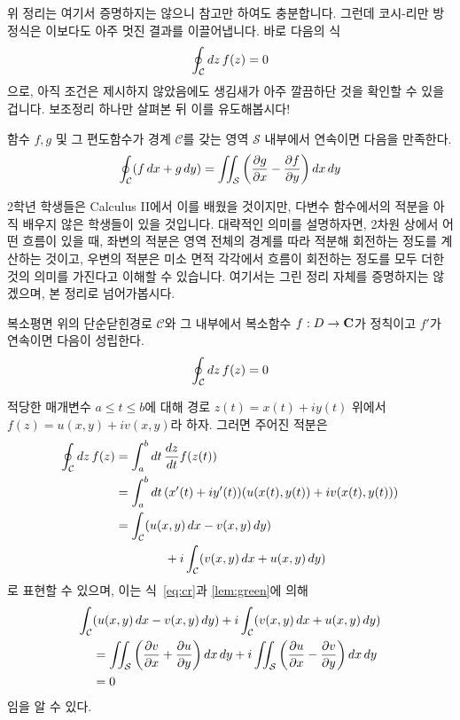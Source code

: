 \documentclass[11pt]{book}
\begin{document}
\begin{MLPar}
위 정리는 여기서 증명하지는 않으니 참고만 하여도 충분합니다.
그런데 코시-리만 방정식은 이보다도 아주 멋진 결과를 이끌어냅니다.
바로 다음의 식
\[\oint_{\mathcal{C}}\dd{z} f(z) = 0\]
으로, 아직 조건은 제시하지 않았음에도 생김새가 아주 깔끔하단 것을 확인할 수 있을겁니다.
보조정리 하나만 살펴본 뒤 이를 유도해봅시다!
\end{MLPar}

\begin{MLLem}
함수 \(f, g\) 및 그 편도함수가 경계 \(\mathcal{C}\)를 갖는 영역 \(\mathcal{S}\) 내부에서 연속이면 다음을 만족한다.
\[\cint(f\dd{x} + g\dd{y}) = \iint_{\mathcal{S}}\pqty{\pdv{g}{x}-\pdv{f}{y}}\dd{x}\dd{y}\]
\end{MLLem}

\begin{MLPar}
2학년 학생들은 Calculus II에서 이를 배웠을 것이지만, 다변수 함수에서의 적분을 아직 배우지 않은 학생들이 있을 것입니다.
대략적인 의미를 설명하자면, 2차원 상에서 어떤 흐름이 있을 때, 좌변의 적분은 영역 전체의 경계를 따라 적분해 회전하는 정도를 계산하는 것이고, 우변의 적분은 미소 면적 각각에서 흐름이 회전하는 정도를 모두 더한 것의 의미를 가진다고 이해할 수 있습니다.
여기서는 그린 정리 자체를 증명하지는 않겠으며, 본 정리로 넘어가봅시다.
\end{MLPar}

\begin{MLThm}
복소평면 위의 단순닫힌경로 \(\mathcal{C}\)와 그 내부에서 복소함수 \(f: D \rightarrow \mbox{$\mathbf C$}\)가 정칙이고 \(f'\)가 연속이면 다음이 성립한다.
\[\oint_{\mathcal{C}}\dd{z} f(z) = 0\]
\end{MLThm}

\begin{MLPrf}
적당한 매개변수 $a \le t \le b$에 대해 경로 \(z(t) = x(t) + iy(t)\) 위에서 \(f(z) = u(x, y) + iv(x, y)\)라 하자.
그러면 주어진 적분은
\begin{align*}
\oint_{\mathcal{C}}\dd{z} f(z) &= \int_a^b \dd{t} \dv{z}{t} f(z(t)) \\
&= \int_a^b \dd{t} (x'(t) + iy'(t))(u(x(t), y(t)) + iv(x(t), y(t))) \\
&= \int_{\mathcal{C}} (u(x, y) \dd{x} - v(x, y) \dd{y}) \\
&\qquad\qquad + i\int_{\mathcal{C}} (v(x, y)\dd{x} + u(x, y)\dd{y})
\end{align*}
로 표현할 수 있으며, 이는 식~\ref{eq:cr}과 \ref{lem:green}에 의해
\begin{align*}
\int_{\mathcal{C}} & (u(x, y) \dd{x} - v(x, y) \dd{y}) + i\int_{\mathcal{C}} (v(x, y)\dd{x} + u(x, y)\dd{y}) \\
&= \iint_{\mathcal{S}} \pqty{\pdv{v}{x} + \pdv{u}{y}} \dd{x} \dd{y} + i\iint_{\mathcal{S}} \pqty{\pdv{u}{x} - \pdv{v}{y}} \dd{x} \dd{y} \\
&= 0
\end{align*}
임을 알 수 있다.
\end{MLPrf}
\end{document}
